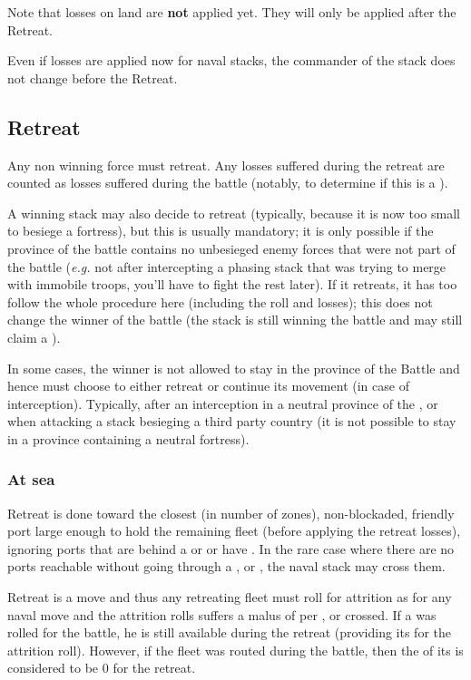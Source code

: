 Note that losses on land are \textbf{not} applied yet. They will only be
applied after the Retreat.

Even if losses are applied now for naval stacks, the commander of the stack
does not change before the Retreat.

\subsection{Retreat}
\label{chMilitary:Battle:Retreat}
Any non winning force must retreat. Any losses suffered during the retreat are
counted as losses suffered during the battle (notably, to determine if this is
a ).

A winning stack may also decide to retreat (typically, because it is now too
small to besiege a fortress), but this is usually mandatory; it is only
possible if the province of the battle contains no unbesieged enemy forces
that were not part of the battle (\emph{e.g.} not after intercepting a phasing
stack that was trying to merge with immobile troops, you'll have to fight the
rest later). If it retreats, it has too follow the whole procedure here
(including the roll and losses); this does not change the winner of the battle
(the stack is still winning the battle and may still claim a ).

In some cases, the winner is not allowed to stay in the province of the Battle
and hence must choose to either retreat or continue its movement (in case of
interception). Typically, after an interception in a neutral province of the
\HRE, or when attacking a stack besieging a third party country (it is not
possible to stay in a province containing a neutral fortress).

\subsubsection{At sea}
Retreat is done toward the closest (in number of zones), non-blockaded,
friendly port large enough to hold the remaining fleet (before applying the
retreat losses), ignoring ports that are behind a \Presidio or \StraitFort or
have \USURE. In the rare case where there are no ports reachable without going
through a \Presidio, \StraitFort or \USURE, the naval stack may cross them.

Retreat is a move and thus any retreating fleet must roll for attrition as for
any naval move and the attrition rolls suffers a malus of  per
\Presidio, \StraitFort or \USURE crossed. If a  \LeaderA
was rolled for the battle, he is still available during the retreat (providing
its \Man for the attrition roll). However, if the fleet was routed during the
battle, then the \Man of its \LeaderA is considered to be 0 for the retreat.

